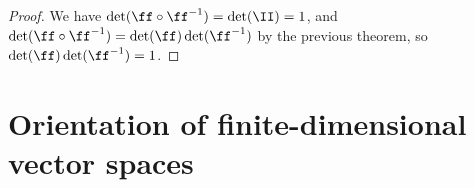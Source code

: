 \begin{proof}
   We have $\det(\ff \circ \ff^{-1}) = \det(\II) = 1$, and $\det(\ff \circ \ff^{-1}) = \det(\ff) \det(\ff^{-1})$ by the previous theorem, so $\det(\ff) \det(\ff^{-1}) = 1$.
\end{proof}


    
    


\newpage

\section{Orientation of finite-dimensional vector spaces}
\label{ch::exterior_pwrs::section::orientation}

